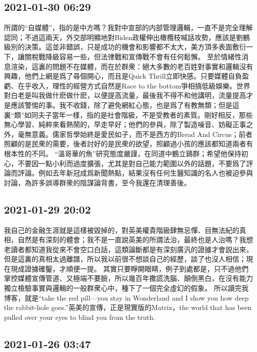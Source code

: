 \documentclass[twocolumn]{ctexart}
\begin{document}
\subsection*{2021-01-30 06:29}

所謂的“自媒體”，指的是中方嗎？我對中宣部的内部管理邏輯，一直不是完全理解認同；不過這兩天，外交部明顯地對Biden政權伸出橄欖枝喊話攻勢，應該是劉鶴級別的決策。這並非錯誤，只是成功的機會和影響都不太大，美方頂多表面敷衍一下，讓關稅戰降級容易一些，但法律戰和宣傳戰不會有任何鬆懈。
至於情緒性消息渲染，這裏的問題不在媒體，而在於群衆：絕大多數的老百姓對事實和邏輯沒有興趣，他們上網是爲了尋個開心，而且是Quick Thrill立即快感。只要媒體自負盈虧、在乎收入，理性的經營方式自然是Race to the bottom爭相搞低級娛樂。世界對白老是叫我做什麽做什麽，以便提高流量，最後我不得不和他講明，流量提高才是應該警惕的事。我不收錢，除了避免網紅心態，也是爲了有教無類；但是這裏“類”如同夫子當年一樣，指的是社會階級，不是受教者的素質。剛好相反，那些無心學習、純粹來看熱鬧的，早走早好；他們的參與，除了製造噪音、妨礙正事之外，毫無意義。儒家哲學始終是愛民如子，而不是西方的Bread And Circus；前者照顧的是民衆的需要，後者討好的是民衆的欲望，照顧過小孩的應該都知道兩者有根本性的不同。
“溫哥華的魚”研究態度嚴謹，在同道中鶴立鷄群；希望他保持初心，不要因一點小利而過度擴張，尤其是對自己能力範圍以外的話題，不要爲了評論而評論。例如去年新冠成爲新聞熱點，結果沒有任何生醫知識的名人也被迫參與討論，為許多誤導群衆的陰謀論背書，至今我還在清理善後。
\subsection*{2021-01-29 20:02}

我自己的金融生涯就是這樣被毀掉的，對英美權貴階級肆無忌憚、目無法紀的真相，自然是有深刻的體會；我不是一直說英美的所謂法治，最終也是人治嗎？我想老讀者都知道我從來不會空口白話，這類論斷都是有深刻廣汎的證據才會説出來，但是這裏的真相太過離譜，所以我以前很不想談自己的經歷，談了也沒人相信；現在現成證據確鑿，才順便一提。
其實只要睜開眼睛，例子到處都是，只不過他們掌控媒體宣傳管道、又極端不要臉，所以幾百年撒謊洗腦、顛倒黑白，在沒有能力獨立檢驗事實與邏輯的一般群衆心中，種下了一個完全虛幻的假象。
所以讀完我博客，就是“take the red pill—you stay in Wonderland and I show you how deep the rabbit-hole goes.”英美的宣傳，正是現實版的Matrix，the world that has been pulled over your eyes to blind you from the truth.
\subsection*{2021-01-26 03:47}
\end{document}

